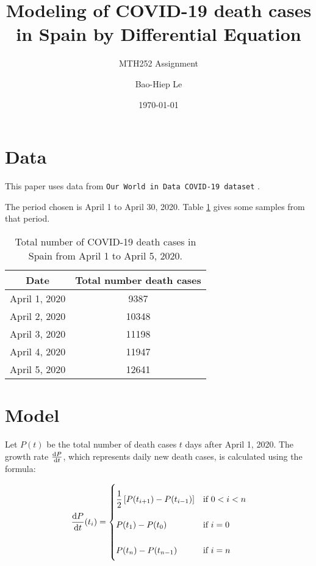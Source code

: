 \documentclass[12pt]{scrartcl}
\title{Modeling of COVID-19 death cases in Spain by Differential Equation}
\subtitle{MTH252 Assignment}
\author{Bao-Hiep Le}
\date{\today}
\begin{document}
\maketitle


\section*{Data}

This paper uses data from \texttt{Our World in Data COVID-19 dataset} \autocite{owid-covid-data}.

The period chosen is April 1 to April 30, 2020. Table \ref{table:1} gives some samples from that period.

\begin{table}[h!]
\centering
\begin{tabular}{ |c|c| }
  \hline
  \textbf{Date} & \textbf{Total number death cases} \\
  \hline
  April 1, 2020 & 9387 \\
  April 2, 2020 & 10348 \\
  April 3, 2020 & 11198 \\
  April 4, 2020 & 11947 \\
  April 5, 2020 & 12641 \\
  \hline
\end{tabular}
\caption{Total number of COVID-19 death cases in Spain from April 1 to April 5, 2020.}
\label{table:1}
\end{table}

\section*{Model}

Let $P(t)$ be the total number of death cases $t$ days after April 1, 2020.
The growth rate $\diff{P}{t}$, which represents daily new death cases,
is calculated using the formula:

\begin{align} \label{rate_formula}
\diff{P}{t}(t_i) =
\renewcommand{\arraystretch}{2.5}\left\{\begin{array}{@{}l@{\quad}l@{}}
  \dfrac{1}{2} \left [ P(t_{i + 1}) - P(t_{i - 1}) \right ] &\text{if } 0 < i < n \\
  P(t_{1}) - P(t_{0}) &\text{if } i = 0 \\
  P(t_{n}) - P(t_{n - 1}) &\text{if } i = n \\
\end{array}\right.\kern-\nulldelimiterspace
\end{align}
\end{document}
